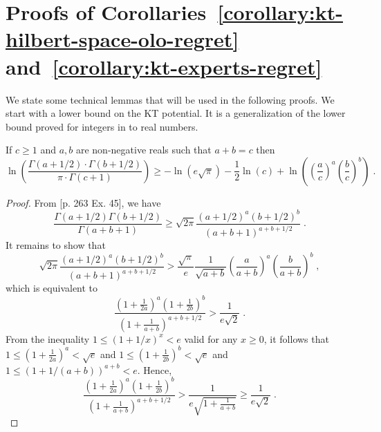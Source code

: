 \section{Proofs of Corollaries~\ref{corollary:kt-hilbert-space-olo-regret} and~\ref{corollary:kt-experts-regret}}
\label{section:corollaries_reductions}

We state some technical lemmas that will be used in the following proofs. We
start with a lower bound on the \ac{KT} potential. It is a generalization of
the lower bound proved for integers in \citet{Willems-Shtarkov-Tjalkens-1995}
to real numbers.

\begin{lemma}
\label{lemma:approx_gamma_real}
If $c \ge 1$ and $a,b$ are non-negative reals such that $a + b = c$ then
\[
\ln \left(\frac{\Gamma(a + 1/2) \cdot \Gamma(b + 1/2)}{\pi \cdot \Gamma(c+1)} \right)
\ge - \ln(e \sqrt{\pi}) -\frac{1}{2} \ln(c) +\ln \left(\left( \frac{a}{c} \right)^a \left( \frac{b}{c} \right)^b\right) \; .
\]
\end{lemma}
%
\begin{proof}
From \cite{Whittaker-Watson-1962}[p. 263 Ex. 45], we have
\[
\frac{\Gamma(a+1/2)\Gamma(b+1/2)}{\Gamma(a+b+1)} \ge \sqrt{2\pi} \frac{(a+1/2)^a (b+1/2)^b}{(a+b+1)^{a+b+1/2}} \; .
\]
It remains to show that
\[
\sqrt{2\pi} \frac{(a+1/2)^a (b+1/2)^b}{(a+b+1)^{a+b+1/2}} > \frac{\sqrt{\pi}}{e} \frac{1}{\sqrt{a+b}} \left( \frac{a}{a+b} \right)^a \left( \frac{b}{a+b} \right)^b \; ,
\]
which is equivalent to
\[
\frac{(1+\frac{1}{2a})^a (1+\frac{1}{2b})^b}{(1+\frac{1}{a+b})^{a+b+1/2}} > \frac{1}{e\sqrt{2}} \; .
\]
From the inequality $1 \le (1+1/x)^x < e$ valid for any $x \ge 0$, it follows
that $1 \le (1+\frac{1}{2a})^a < \sqrt{e}$ and $1 \le (1+\frac{1}{2b})^b < \sqrt{e}$
and $1 \le (1+1/(a+b))^{a+b} < e$. Hence,
\[
\frac{(1+\frac{1}{2a})^a (1+\frac{1}{2b})^b}{(1+\frac{1}{a+b})^{a+b+1/2}}
> \frac{1}{e \sqrt{1 + \frac{1}{a+b}}}
\ge \frac{1}{e \sqrt{2}} \; .
\]
\end{proof}


